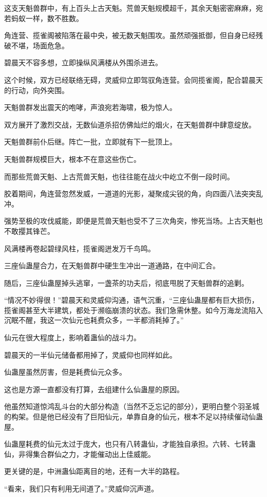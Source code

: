 \begin{this_body}
这支天魁兽群中，有上百头上古天魁。荒兽天魁规模超千，其余天魁密密麻麻，宛若蚂蚁一样，数不胜数。

角连营、揽雀阁被陷落在最中央，被无数天魁围攻。虽然顽强抵御，但自身已经残破不堪，场面危急。

碧晨天不容多想，立即操纵风满楼从外围杀进去。

这个时候，双方已经联络无碍，灵威仰立即驾驭角连营。会同揽雀阁，配合碧晨天的行动，向外突围。

天魁兽群发出震天的咆哮，声浪宛若海啸，极为惊人。

双方展开了激烈交战，无数仙道杀招仿佛灿烂的烟火，在天魁兽群中肆意绽放。

天魁兽群前仆后继。阵亡一批，立即就有下一批顶上。

天魁兽群规模巨大，根本不在意这些伤亡。

而那些荒兽天魁、上古荒兽天魁，也往往能在战火中屹立不倒一段时间。

胶着期间，角连营忽然发威，一道道的光影，凝聚成尖锐的角，向四面八法突突乱冲。

强势至极的攻伐威能，即便是荒兽天魁也受不了三次角突，惨死当场。上古天魁也不敢撄其锋芒。

风满楼再卷起碧绿风柱，揽雀阁迸发万千鸟鸣。

三座仙蛊屋合力，在天魁兽群中硬生生冲出一道通路，在中间汇合。

随后，三座仙蛊屋掉头逃窜，一盏茶的功夫后，彻底甩脱了天魁兽群的追剿。

“情况不妙得很！”碧晨天和灵威仰沟通，语气沉重，“三座仙蛊屋都有巨大损伤，揽雀阁甚至大半建筑，都处于濒临崩溃的状态。我们急需休整。如今万海龙流陷入沉眠不醒，我这一次仙元也耗费众多，一半都消耗掉了。”

仙元在很大程度上，影响着蛊仙的战斗力。

碧晨天的一半仙元储备都用掉了，灵威仰也同样如此。

仙蛊屋虽然厉害，但是耗费仙元众多。

这也是方源一直都没有打算，去组建什么仙蛊屋的原因。

他虽然知道惊鸿乱斗台的大部分构造（当然不乏忘记的部分），更明白整个羽圣城的构架。但是他已经没有了巨阳仙元，单靠自身的仙元，根本不足以持续催动仙蛊屋。

仙蛊屋耗费的仙元太过于庞大，也只有八转蛊仙，才能独自承担。六转、七转蛊仙，非得集合群仙之力，才能催动出上佳威能。

更关键的是，中洲蛊仙距离目的地，还有一大半的路程。

“看来，我们只有利用无间道了。”灵威仰沉声道。


\end{this_body}
